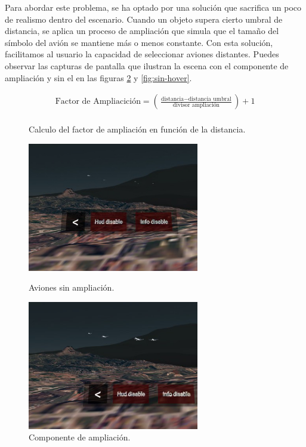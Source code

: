 \documentclass[a4paper, 11pt]{book}
\begin{document}
Para abordar este problema, se ha optado por una solución que sacrifica un poco de realismo dentro del escenario. Cuando un objeto supera cierto umbral de distancia, se aplica un proceso de ampliación que simula que el tamaño del símbolo del avión se mantiene más o menos constante. Con esta solución, facilitamos al usuario la capacidad de seleccionar aviones distantes. Puedes observar las capturas de pantalla que ilustran la escena con el componente de ampliación y sin el en las figuras \ref{fig:con-hover} y \ref{fig:sin-hover}.
\begin{figure}[h]
	\begin{align*}
		\text{{Factor de Ampliacición}} = \left(\frac{{\text{{distancia}} - \text{{distancia umbral}}}}{{\text{{divisor ampliación}}}}\right) + 1\\
	\end{align*}
	\caption{Calculo del factor de ampliación en función de la distancia.}
	\label{formula:ampliación}
\end{figure}
\begin{figure}[h]
  \begin{minipage}[t]{0.5\linewidth}
    \centering
    \includegraphics[width=7.5cm, keepaspectratio]{img/sin_hover.jpg}
    \caption{Aviones sin ampliación.}
    \label{fig:sin-hover}
  \end{minipage}%
  \begin{minipage}[t]{0.5\linewidth}
    \centering
    \includegraphics[width=7.5cm, keepaspectratio]{img/con_hover.jpg}
    \caption{Componente de ampliación.}
    \label{fig:con-hover}    
  \end{minipage}
\end{figure}
\end{document}
